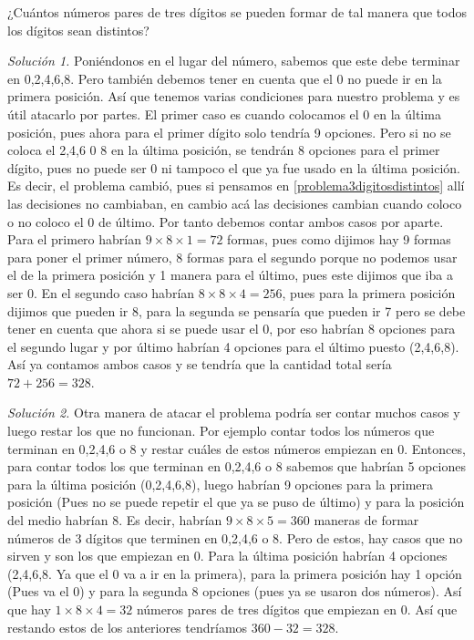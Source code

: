 \begin{ejemplo}
	¿Cuántos números pares de tres dígitos se pueden formar de tal manera que todos los dígitos sean distintos?
\end{ejemplo}

\textit{Solución 1.} Poniéndonos en el lugar del número, sabemos que este debe terminar en 0,2,4,6,8. Pero también debemos tener en cuenta que el 0 no puede ir en la primera posición. Así que tenemos varias condiciones para nuestro problema y es útil atacarlo por partes. El primer caso es cuando colocamos el 0 en la última posición, pues ahora para el primer dígito solo tendría 9 opciones. Pero si no se coloca el 2,4,6 0 8 en la última posición, se tendrán 8 opciones para el primer dígito, pues no puede ser 0 ni tampoco el que ya fue usado en la última posición. Es decir, el problema cambió, pues si pensamos en \ref{problema3digitosdistintos} allí las decisiones no cambiaban, en cambio acá las decisiones cambian cuando coloco o no coloco el 0 de último. Por tanto debemos contar ambos casos por aparte. Para el primero habrían $9\times 8 \times 1=72$ formas, pues como dijimos hay 9 formas para poner el primer número, 8 formas para el segundo porque no podemos usar el de la primera posición y 1 manera para el último, pues este dijimos que iba a ser 0. En el segundo caso habrían $8\times 8\times 4= 256$, pues para la primera posición dijimos que pueden ir 8, para la segunda se pensaría que pueden ir 7 pero se debe tener en cuenta que ahora si se puede usar el 0, por eso habrían 8 opciones para el segundo lugar y por último habrían 4 opciones para el último puesto (2,4,6,8). Así ya contamos ambos casos y se tendría que la cantidad total sería $72+256=328$.

\textit{Solución 2.} Otra manera de atacar el problema podría ser contar muchos casos y luego restar los que no funcionan. Por ejemplo contar todos los números que terminan en 0,2,4,6 o 8 y restar cuáles de estos números empiezan en 0. Entonces, para contar todos los que terminan en 0,2,4,6 o 8 sabemos que habrían 5 opciones para la última posición (0,2,4,6,8), luego habrían 9 opciones para la primera posición (Pues no se puede repetir el que ya se puso de último) y para la posición del medio habrían 8. Es decir, habrían $9\times 8\times 5=360$ maneras de formar números de 3 dígitos que terminen en 0,2,4,6 o 8. Pero de estos, hay casos que no sirven y son los que empiezan en 0. Para la última posición habrían 4 opciones (2,4,6,8. Ya que el 0 va a ir en la primera), para la primera posición hay 1 opción (Pues va el 0) y para la segunda 8 opciones (pues ya se usaron dos números). Así que hay $1\times 8\times 4=32$ números pares de tres dígitos que empiezan en 0. Así que restando estos de los anteriores tendríamos $360-32=328$.


